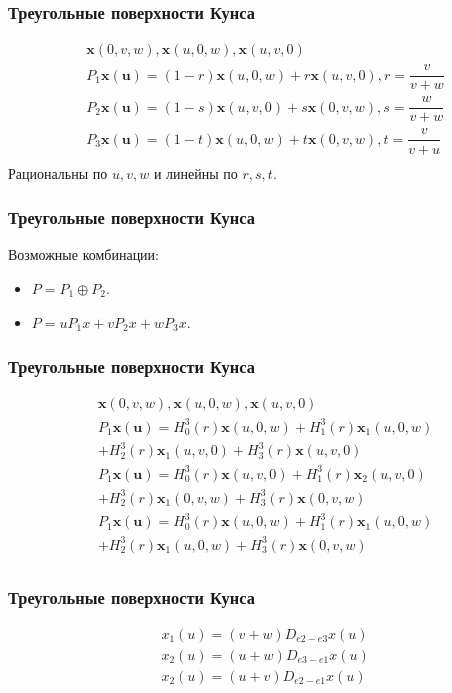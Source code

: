 \documentclass[14pt]{beamer}
\begin{document}
\begin{frame}
\frametitle{Треугольные поверхности Кунса}
\begin{align*}
  &\bm{x}(0, v, w), \bm{x}(u, 0, w), \bm{x}(u, v, 0)\\
  &P_1\bm{x(u)} = (1 - r)\bm{x}(u, 0, w) + r\bm{x}(u, v, 0), r = \dfrac{v}{v + w}\\
  &P_2\bm{x(u)} = (1 - s)\bm{x}(u, v, 0) + s\bm{x}(0, v, w), s = \dfrac{w}{v + w}\\
  &P_3\bm{x(u)} = (1 - t)\bm{x}(u, 0, w) + t\bm{x}(0, v, w), t = \dfrac{v}{v + u}\\
\end{align*}
Рациональны по $u, v, w$ и линейны по $r, s, t$.
\end{frame}

\begin{frame}
\frametitle{Треугольные поверхности Кунса}
Возможные комбинации:

\begin{itemize}
  \item $P = P_1 \oplus P_2$.
  \item $P = uP_1x + vP_2x + wP_3x$.
\end{itemize}
\end{frame}

\begin{frame}
\frametitle{Треугольные поверхности Кунса}
\begin{align*}
  &\bm{x}(0, v, w), \bm{x}(u, 0, w), \bm{x}(u, v, 0)\\
  &P_1\bm{x(u)} = H_0^3(r)\bm{x}(u, 0, w) + H_1^3(r)\bm{x}_1(u, 0, w)\\
    &+ H_2^3(r)\bm{x}_1(u, v, 0) + H_3^3(r)\bm{x}(u, v, 0)\\
  &P_1\bm{x(u)} = H_0^3(r)\bm{x}(u, v, 0) + H_1^3(r)\bm{x}_2(u, v, 0)\\
    &+ H_2^3(r)\bm{x}_1(0, v, w) + H_3^3(r)\bm{x}(0, v, w)\\
  &P_1\bm{x(u)} = H_0^3(r)\bm{x}(u, 0, w) + H_1^3(r)\bm{x}_1(u, 0, w)\\
    &+ H_2^3(r)\bm{x}_1(u, 0, w) + H_3^3(r)\bm{x}(0, v, w)\\
\end{align*}
\end{frame}


\begin{frame}
\frametitle{Треугольные поверхности Кунса}
\begin{align*}
  &x_1(u) = (v + w)D_{e2 - e3}x(u)\\
  &x_2(u) = (u + w)D_{e3 - e1}x(u)\\
  &x_2(u) = (u + v)D_{e2 - e1}x(u)\\
\end{align*}
\end{frame}
\end{document}
